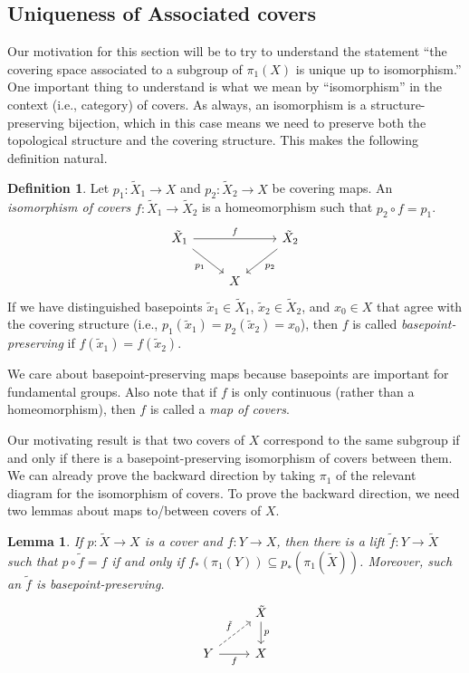 \documentclass{article}
\newtheorem{lem}[thm]{Lemma}
\theoremstyle{definition}
\newtheorem{defi}[thm]{Definition}
\theoremstyle{remark}
\numberwithin{figure}{section}
\begin{document}
\subsection{Uniqueness of Associated covers}
Our motivation for this section will be to try to understand the statement ``the covering space associated to a subgroup of $\pi_1(X)$ is unique up to isomorphism.'' One important thing to understand is what we mean by ``isomorphism'' in the context (i.e., category) of covers. As always, an isomorphism is a structure-preserving bijection, which in this case means we need to preserve both the topological structure and the covering structure. This makes the following definition natural.

\begin{defi}
	Let $p_1 : \tilde X_1 \to X$ and $p_2 : \tilde X_2 \to X$ be covering maps. An \emph{isomorphism of covers} $f : \tilde X_1 \to \tilde X_2$ is a homeomorphism such that $p_2 \circ f = p_1$.
	\[
	\begin{tikzcd}
		\tilde X_1 \ar[rr, "f"] \ar[dr, "p_1"'] & & \tilde X_2 \ar[dl, "p_2"]\\
		& X
	\end{tikzcd}
	\]
	If we have distinguished basepoints $\tilde x_1 \in \tilde X_1$, $\tilde x_2 \in \tilde X_2$, and $x_0 \in X$ that agree with the covering structure (i.e., $p_1(\tilde x_1) = p_2(\tilde x_2) = x_0$), then $f$ is called \emph{basepoint-preserving} if $f(\tilde x_1) = f(\tilde x_2)$.
\end{defi}

We care about basepoint-preserving maps because basepoints are important for fundamental groups. Also note that if $f$ is only continuous (rather than a homeomorphism), then $f$ is called a \emph{map of covers}.

Our motivating result is that two covers of $X$ correspond to the same subgroup if and only if there is a basepoint-preserving isomorphism of covers between them. We can already prove the backward direction by taking $\pi_1$ of the relevant diagram for the isomorphism of covers. To prove the backward direction, we need two lemmas about maps to/between covers of $X$.

\begin{lem}\label{lem:map lift exists}
	If $p : \tilde X \to X$ is a cover and $f : Y \to X$, then there is a lift $\tilde f : Y \to \tilde X$ such that $p \circ \tilde f = f$ if and only if $f_*(\pi_1(Y)) \subseteq p_*(\pi_1(\tilde X))$. Moreover, such an $\tilde f$ is basepoint-preserving.
	\[
	\begin{tikzcd}
		& \tilde X \ar[d, "p"]\\
		Y \ar[r, "f"'] \ar[ur, dashed, "\tilde f"] & X
	\end{tikzcd}
	\]
\end{lem}
\end{document}
